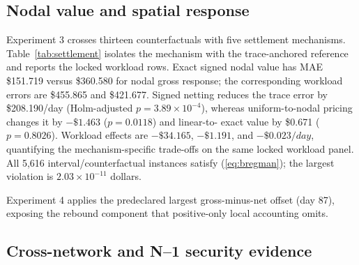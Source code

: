 \documentclass[10pt,journal]{IEEEtran}
\begin{document}
\subsection{Nodal value and spatial response}

Experiment 3 crosses thirteen counterfactuals with five settlement mechanisms.
Table~\ref{tab:settlement} isolates the mechanism with the trace-anchored
reference and reports the locked workload rows. Exact signed nodal value has
MAE \$151.719 versus \$360.580 for nodal gross response; the corresponding
workload errors are \$455.865 and \$421.677. Signed netting reduces the trace
error by \$208.190/day (Holm-adjusted $p=3.89\times10^{-4}$), whereas
uniform-to-nodal pricing changes it by $-\$1.463$ ($p=0.0118$) and linear-to-
exact value by \$0.671 ($p=0.8026$). Workload effects are
$-\$34.165$, $-\$1.191$, and $-\$0.023/day$, quantifying the
mechanism-specific trade-offs on the same locked workload panel.
All 5,616 interval/counterfactual instances satisfy (\ref{eq:bregman}); the
largest violation is $2.03\times10^{-11}$ dollars.

\begin{table}[t]
\centering
\caption{Base-case and complete N--1 settlement errors (USD/day).}
\label{tab:settlement}
\scriptsize
{}
\end{table}

Experiment 4 applies the predeclared largest gross-minus-net offset (day 87),
exposing the rebound component that positive-only local accounting omits.

\subsection{Cross-network and N--1 security evidence}
\end{document}

